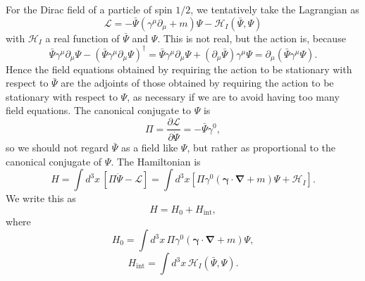 For the Dirac field of a particle of spin $1/2$, we tentatively take the
Lagrangian as
\begin{equation}
\mathcal L=-\bar\Psi(\gamma^\mu\partial_\mu+m)\Psi
-\mathcal H_I(\bar\Psi,\Psi)
\tag{7.5.34}\label{eq:7.5.34}
\end{equation}
with $\mathcal H_I$ a real function of $\bar\Psi$ and $\Psi$. This is not real,
but the action is, because
\[
\bar\Psi\gamma^\mu\partial_\mu\Psi
-(\bar\Psi\gamma^\mu\partial_\mu\Psi)^\dagger
=\bar\Psi\gamma^\mu\partial_\mu\Psi
+(\partial_\mu\bar\Psi)\gamma^\mu\Psi
=\partial_\mu(\bar\Psi\gamma^\mu\Psi).
\]
Hence the field equations obtained by requiring the action to be stationary
with respect to $\bar\Psi$ are the adjoints of those obtained by requiring the
action to be stationary with respect to $\Psi$, as necessary if we are to
avoid having too many field equations. The canonical conjugate to $\Psi$ is
\begin{equation}
\Pi=\frac{\partial\mathcal L}{\partial\dot\Psi}=-\bar\Psi\gamma^0,
\tag{7.5.35}\label{eq:7.5.35}
\end{equation}
so we should not regard $\bar\Psi$ as a field like $\Psi$, but rather as
proportional to the canonical conjugate of $\Psi$. The Hamiltonian is
\[
H=\int d^3x\,[\Pi\dot\Psi-\mathcal L]
=\int d^3x\left[\Pi\gamma^0(\boldsymbol\gamma\cdot\boldsymbol\nabla+m)\Psi
+\mathcal H_I\right].
\]
We write this as
\begin{equation}
H=H_0+H_{\mathrm{int}},
\tag{7.5.36}\label{eq:7.5.36}
\end{equation}
where
\begin{equation}
H_0=\int d^3x\,\Pi\gamma^0(\boldsymbol\gamma\cdot\boldsymbol\nabla+m)\Psi,
\tag{7.5.37}\label{eq:7.5.37}
\end{equation}
\begin{equation}
H_{\mathrm{int}}=\int d^3x\,\mathcal H_I(\bar\Psi,\Psi).
\tag{7.5.38}\label{eq:7.5.38}
\end{equation}


